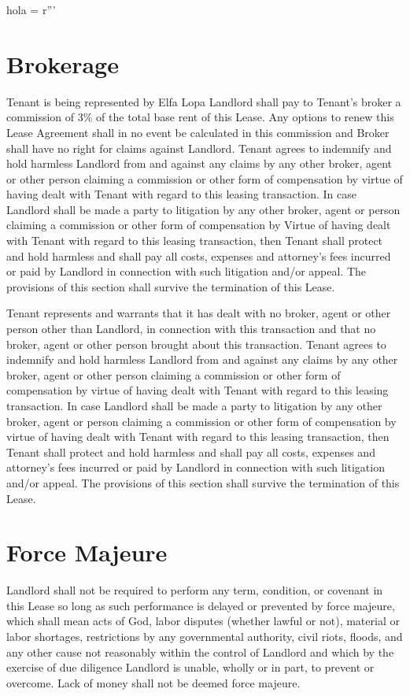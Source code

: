hola = r'''\documentclass{article}
\newcommand{\brokername}{Elfa Lopa}
\newcommand{\comsplit}{3\%}
\begin{document}
\section{Brokerage}
    Tenant is being represented by \brokername{} Landlord shall pay to Tenant's broker a commission of \comsplit{} of the total base rent of this Lease. Any options to renew this Lease Agreement shall in no event be calculated in this commission and Broker shall have no right for claims against Landlord. Tenant agrees to indemnify and hold harmless Landlord from and against any claims by any other broker, agent or other person claiming a commission or other form of compensation by virtue of having dealt with Tenant with regard to this leasing transaction. In case Landlord shall be made a party to litigation by any other broker, agent or person claiming a commission or other form of compensation by Virtue of having dealt with Tenant with regard to this leasing transaction, then Tenant shall protect and hold harmless and shall pay all costs, expenses and attorney's fees incurred or paid by Landlord in connection with such litigation and/or appeal. The provisions of this section shall survive the termination of this Lease.
    
    Tenant represents and warrants that it has dealt with no broker, agent or other person other than Landlord, in connection with this transaction and that no broker, agent or other person brought about this transaction. Tenant agrees to indemnify and hold harmless Landlord from and against any claims by any other broker, agent or other person claiming a commission or other form of compensation by virtue of having dealt with Tenant with regard to this leasing transaction. In case Landlord shall be made a party to litigation by any other broker, agent or person claiming a commission or other form of compensation by virtue of having dealt with Tenant with regard to this leasing transaction, then Tenant shall protect and hold harmless and shall pay all costs, expenses and attorney's fees incurred or paid by Landlord in connection with such litigation and/or appeal. The provisions of this section shall survive the termination of this Lease.



\section{Force Majeure}
    Landlord shall not be required to perform any term, condition, or covenant in this Lease so long as such performance is delayed or prevented by force majeure, which shall mean acts of God, labor disputes (whether lawful or not), material or labor shortages, restrictions by any governmental authority, civil riots, floods, and any other cause not reasonably within the control of Landlord and which by the exercise of due diligence Landlord is unable, wholly or in part, to prevent or overcome. Lack of money shall not be deemed force majeure.
\end{document}

